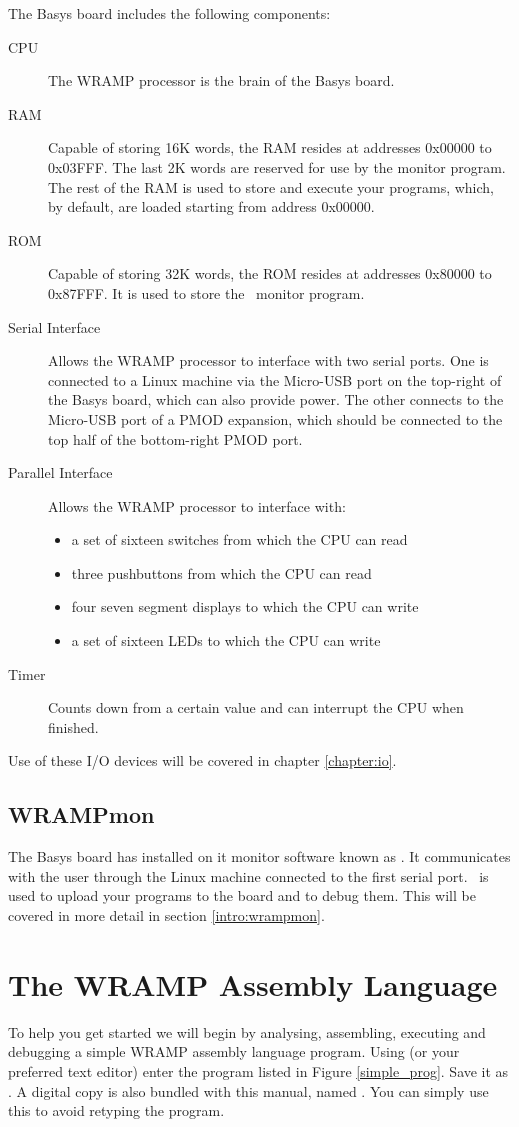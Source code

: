 The Basys board includes the following components:

\begin{description}
\item[CPU] The WRAMP processor is the brain of the Basys board.
%
\item[RAM] Capable of storing 16K words, the RAM resides at addresses 0x00000
to 0x03FFF. The last 2K words are reserved for use by the monitor program. The rest 
of the RAM is used to store and execute your programs, which, by default, are 
loaded starting from address 0x00000.
%
\item[ROM] Capable of storing 32K words, the ROM resides at addresses 
0x80000 to 0x87FFF. It is used to store the \WRAMPmon\ monitor program.
%
\item[Serial Interface] Allows the WRAMP processor to interface with two serial
ports. One is connected to a Linux machine via the Micro-USB port on the top-right
of the Basys board, which can also provide power. The other connects to the Micro-USB
port of a PMOD expansion, which should be connected to the top half of the 
bottom-right PMOD port.
%
\item[Parallel Interface] Allows the WRAMP processor to interface with: 
\begin{itemize}
\item a set of sixteen switches from which the CPU can read
\item three pushbuttons from which the CPU can read
\item four seven segment displays to which the CPU can write
\item a set of sixteen LEDs to which the CPU can write
\end{itemize}
\item[Timer] Counts down from a certain value and can interrupt the CPU when 
finished.
%
\end{description}
Use of these I/O devices will be covered in chapter \ref{chapter:io}.

\subsection{WRAMPmon}
The Basys board has installed on it monitor software known as \WRAMPmon.
It communicates with the user through the Linux machine connected to
the first serial port. \WRAMPmon\ is used to upload your programs to the
board and to debug them. This will be covered in more detail in
section \ref{intro:wrampmon}.
%
%
%
\section{The WRAMP Assembly Language}
%
To help you get started we will begin by analysing, assembling,
executing and debugging a simple WRAMP assembly language program.
Using  (or your preferred text editor) enter the
program listed in Figure \ref{simple_prog}. Save it as .
A digital copy is also bundled with this manual, named .
You can simply use this to avoid retyping the program.

